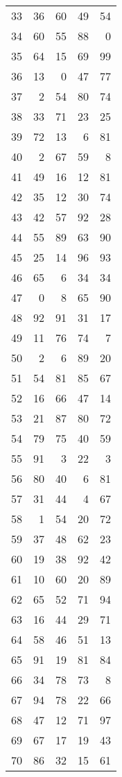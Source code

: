 \begin{longtable}{lrrrr}
33 &  36 &  60 &  49 &  54 \\
34 &  60 &  55 &  88 &   0 \\
35 &  64 &  15 &  69 &  99 \\
36 &  13 &   0 &  47 &  77 \\
37 &   2 &  54 &  80 &  74 \\
38 &  33 &  71 &  23 &  25 \\
39 &  72 &  13 &   6 &  81 \\
40 &   2 &  67 &  59 &   8 \\
41 &  49 &  16 &  12 &  81 \\
42 &  35 &  12 &  30 &  74 \\
43 &  42 &  57 &  92 &  28 \\
44 &  55 &  89 &  63 &  90 \\
45 &  25 &  14 &  96 &  93 \\
46 &  65 &   6 &  34 &  34 \\
47 &   0 &   8 &  65 &  90 \\
48 &  92 &  91 &  31 &  17 \\
49 &  11 &  76 &  74 &   7 \\
50 &   2 &   6 &  89 &  20 \\
51 &  54 &  81 &  85 &  67 \\
52 &  16 &  66 &  47 &  14 \\
53 &  21 &  87 &  80 &  72 \\
54 &  79 &  75 &  40 &  59 \\
55 &  91 &   3 &  22 &   3 \\
56 &  80 &  40 &   6 &  81 \\
57 &  31 &  44 &   4 &  67 \\
58 &   1 &  54 &  20 &  72 \\
59 &  37 &  48 &  62 &  23 \\
60 &  19 &  38 &  92 &  42 \\
61 &  10 &  60 &  20 &  89 \\
62 &  65 &  52 &  71 &  94 \\
63 &  16 &  44 &  29 &  71 \\
64 &  58 &  46 &  51 &  13 \\
65 &  91 &  19 &  81 &  84 \\
66 &  34 &  78 &  73 &   8 \\
67 &  94 &  78 &  22 &  66 \\
68 &  47 &  12 &  71 &  97 \\
69 &  67 &  17 &  19 &  43 \\
70 &  86 &  32 &  15 &  61 \\

\end{longtable}
